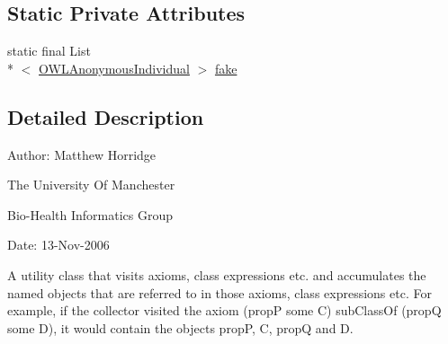 \subsection*{Static Private Attributes}
\begin{DoxyCompactItemize}
\item 
static final List\\*
$<$ \hyperlink{interfaceorg_1_1semanticweb_1_1owlapi_1_1model_1_1_o_w_l_anonymous_individual}{O\-W\-L\-Anonymous\-Individual} $>$ \hyperlink{classuk_1_1ac_1_1manchester_1_1cs_1_1owl_1_1owlapi_1_1_o_w_l_entity_collection_container_collector_afaef4bc0a8d12e430c4c2c3060335dbf}{fake}
\end{DoxyCompactItemize}


\subsection{Detailed Description}
Author\-: Matthew Horridge\par
 The University Of Manchester\par
 Bio-\/\-Health Informatics Group\par
 Date\-: 13-\/\-Nov-\/2006\par
 \par
 

A utility class that visits axioms, class expressions etc. and accumulates the named objects that are referred to in those axioms, class expressions etc. For example, if the collector visited the axiom (prop\-P some C) sub\-Class\-Of (prop\-Q some D), it would contain the objects prop\-P, C, prop\-Q and D. 

